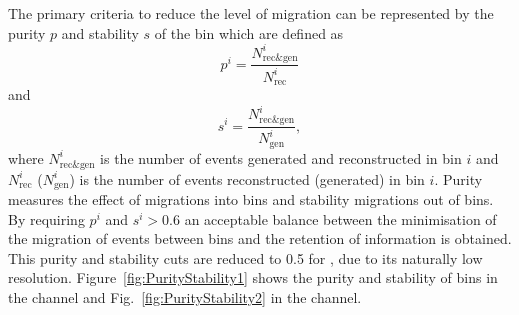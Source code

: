 The primary criteria to reduce the level of migration can be represented by the purity $p$ and stability $s$ of the bin which are defined as
\begin{equation*}
p^{i} = \frac{N^{i}_{\mathrm{rec\&gen}}}{N^{i}_{\mathrm{rec}}}
\end{equation*}
and
\begin{equation*}
s^{i} = \frac{N^{i}_{\mathrm{rec\&gen}}}{N^{i}_{\mathrm{gen}}},
\end{equation*}
where $N^{i}_{\mathrm{rec\&gen}}$ is the number of events generated and reconstructed in bin $i$ and $N^{i}_{\mathrm{rec}}$ ($N^{i}_{\mathrm{gen}}$) is the number of events reconstructed (generated) in bin $i$.  
Purity measures the effect of migrations into bins and stability migrations out of bins.
By requiring $p^{i}$ and $s^{i}>0.6$ an acceptable balance between the minimisation of the migration of events between bins and the retention of information is obtained.
This purity and stability cuts are reduced to 0.5 for \ptmiss{}, due to its naturally low resolution.
Figure~\ref{fig:PurityStability1} shows the purity and stability of bins in the \eJets{} channel and Fig.~\ref{fig:PurityStability2} in the \muJets{} channel.


